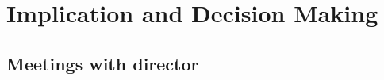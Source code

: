 \documentclass{article}
\begin{document}

\section{Implication and Decision Making}





    \subsection{Meetings with director}
\end{document}
